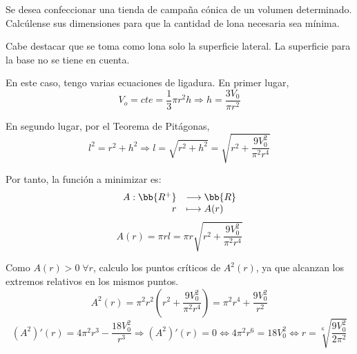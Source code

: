 \begin{ejercicio}
    Se desea confeccionar una tienda de campaña cónica de un volumen determinado. Calcúlense sus dimensiones para que la cantidad de lona necesaria sea mínima.
    \begin{figure}[H]
        \centering
    \end{figure}

    Cabe destacar que se toma como lona solo la superficie lateral. La superficie para la base no se tiene en cuenta.
    
    En este caso, tengo varias ecuaciones de ligadura. En primer lugar,
    $$V_o = cte = \frac{1}{3}\pi r^2h \Longrightarrow h = \frac{3V_0}{\pi r^2}$$

    En segundo lugar, por el Teorema de Pitágonas,
    $$l^2 = r^2 + h^2 \Longrightarrow l = \sqrt{r^2 + h^2} = \sqrt{r^2 + \frac{9V_0^2}{\pi^2r^4}}$$

    Por tanto, la función a minimizar es:
    \begin{equation*}
        \begin{array}{rl}
            A:\bb{R^+} & \longrightarrow \bb{R}\\
                    r & \longmapsto A(r)
        \end{array}
    \end{equation*}
    \begin{equation*}
        A(r) = \pi rl = \pi r\sqrt{r^2 + \frac{9V_0^2}{\pi^2r^4}}
    \end{equation*}

    Como $A(r)>0\;\forall r$, calculo los puntos críticos de $A^2(r)$, ya que alcanzan los extremos relativos en los mismos puntos.
    \begin{equation*}
        A^2(r) = \pi^2 r^2 \left( r^2 + \frac{9V_0^2}{\pi^2r^4}\right) = \pi^2 r^4 + \frac{9V_0^2}{r^2}
    \end{equation*}
    \begin{equation*}
        (A^2)'(r) = 4\pi^2r^3 - \frac{18V_0^2}{r^3} \Longrightarrow (A^2)'(r) = 0\Longleftrightarrow 4\pi^2r^6 = 18V_0^2 \Longleftrightarrow r=\sqrt[6]{\frac{9V_0^2}{2\pi^2}}
    \end{equation*}


\end{ejercicio}
